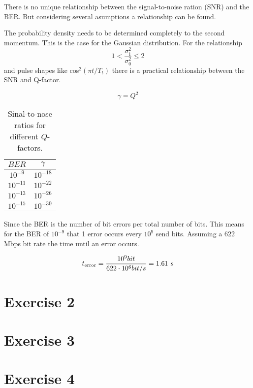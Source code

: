 There is no unique relationship between the signal-to-noise ration (SNR) and the BER. But considering several asumptions a relationship can be found. 

The probability density needs to be determined completely to the second momentum. This is the case for the Gaussian distribution. For the relationship 
\begin{equation}
1 < \frac{\sigma_1^2}{\sigma_0^2}\leq 2
\label{eq:}
\end{equation}
and pulse shapes like cos$^2(\pi t/T_t)$ there is a practical relationship between the SNR and Q-factor.

\begin{equation}
\gamma = Q^2
\label{eq:}
\end{equation}

\begin{table}[h]%
\centering
\caption{Sinal-to-nose ratios for different $Q$-factors.}
 
\begin{tabular}{cc}

\toprule

$BER$	& $\gamma$\\
\midrule
$10^{-9}$ &$10^{-18}$ \\
$10^{-11}$ &$10^{-22}$ \\
$10^{-13}$ &$10^{-26}$ \\
$10^{-15}$ &$10^{-30}$ \\
\bottomrule 
\end{tabular}
\label{tab:1_daempfung}
\end{table}

Since the BER is the number of bit errors per total number of bits. 
This means for the BER of $10^{-9}$ that 1 error occurs every $10^{9}$ send bits. Assuming a 622 Mbps bit rate the time until an error occurs.

\begin{equation}
t_{\mathrm{error}}=\frac{10^9 bit}{622\cdot10^{6} bit/s} = 1.61~s
\label{eq:}
\end{equation}


\section{Exercise 2}




\section{Exercise 3}



\section{Exercise 4}